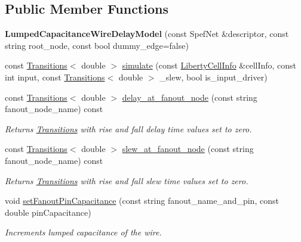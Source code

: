 \subsection*{Public Member Functions}
\begin{DoxyCompactItemize}
\item 
\hypertarget{classLumpedCapacitanceWireDelayModel_ae147cdba517e3f6152ed8234473e5443}{{\bfseries Lumped\-Capacitance\-Wire\-Delay\-Model} (const Spef\-Net \&descriptor, const string root\-\_\-node, const bool dummy\-\_\-edge=false)}\label{classLumpedCapacitanceWireDelayModel_ae147cdba517e3f6152ed8234473e5443}

\item 
const \hyperlink{classTransitions}{Transitions}$<$ double $>$ \hyperlink{classLumpedCapacitanceWireDelayModel_a1bba0aef3bebe8df97a63e05b307b19a}{simulate} (const \hyperlink{structLibertyCellInfo}{Liberty\-Cell\-Info} \&cell\-Info, const int input, const \hyperlink{classTransitions}{Transitions}$<$ double $>$ \-\_\-slew, bool is\-\_\-input\-\_\-driver)
\item 
const \hyperlink{classTransitions}{Transitions}$<$ double $>$ \hyperlink{classLumpedCapacitanceWireDelayModel_a0266cb676908d95bdfcb64d1137898b0}{delay\-\_\-at\-\_\-fanout\-\_\-node} (const string fanout\-\_\-node\-\_\-name) const 
\begin{DoxyCompactList}\small\item\em Returns \hyperlink{classTransitions}{Transitions} with rise and fall delay time values set to zero. \end{DoxyCompactList}\item 
const \hyperlink{classTransitions}{Transitions}$<$ double $>$ \hyperlink{classLumpedCapacitanceWireDelayModel_aaedd69e811e7220e48493c51fb0443ed}{slew\-\_\-at\-\_\-fanout\-\_\-node} (const string fanout\-\_\-node\-\_\-name) const 
\begin{DoxyCompactList}\small\item\em Returns \hyperlink{classTransitions}{Transitions} with rise and fall slew time values set to zero. \end{DoxyCompactList}\item 
void \hyperlink{classLumpedCapacitanceWireDelayModel_a888f7e6a4951837072b937ae30e93073}{set\-Fanout\-Pin\-Capacitance} (const string fanout\-\_\-name\-\_\-and\-\_\-pin, const double pin\-Capacitance)
\begin{DoxyCompactList}\small\item\em Increments lumped capacitance of the wire. \end{DoxyCompactList}\item 

\end{DoxyCompactItemize}
